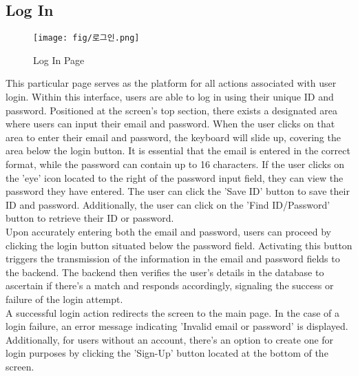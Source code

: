 \documentclass[conference]{IEEEtran}
\begin{document}
\clearpage
\subsection{Log In}
    \begin{figure}[h]
    \centering
    \texttt{[image: fig/로그인.png]}
    \label{fig:Log In Page}
    \caption{Log In Page} 
    \end{figure}
This particular page serves as the platform for all actions associated with user login. Within this interface, users are able to log in using their unique ID and password. Positioned at the screen's top section, there exists a designated area where users can input their email and password. When the user clicks on that area to enter their email and password, the keyboard will slide up, covering the area below the login button. It is essential that the email is entered in the correct format, while the password can contain up to 16 characters. If the user clicks on the 'eye' icon located to the right of the password input field, they can view the password they have entered. The user can click the 'Save ID' button to save their ID and password. Additionally, the user can click on the 'Find ID/Password' button to retrieve their ID or password.\\  Upon accurately entering both the email and password, users can proceed by clicking the login button situated below the password field. Activating this button triggers the transmission of the information in the email and password fields to the backend. The backend then verifies the user's details in the database to ascertain if there's a match and responds accordingly, signaling the success or failure of the login attempt.\\  A successful login action redirects the screen to the main page. In the case of a login failure, an error message indicating 'Invalid email or password' is displayed. Additionally, for users without an account, there's an option to create one for login purposes by clicking the 'Sign-Up' button located at the bottom of the screen. \\ \\
\end{document}
